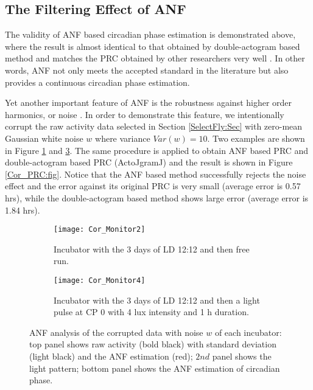 \documentclass[11pt, onecolumn]{IEEEtran}
\begin{document}
\subsection{The Filtering Effect of ANF}\label{PRCnoise:section}
The validity of ANF based circadian phase estimation is demonstrated above, where the result is almost identical to that obtained by double-actogram based method and matches the PRC obtained by other researchers very well \cite{Klarsfeld03}. In other words, ANF not only meets the accepted standard in the literature but also provides a continuous circadian phase estimation.

Yet another important feature of ANF is the robustness against higher order harmonics, or noise \cite{ZhangACC13}. In order to demonstrate this feature, we intentionally corrupt the raw activity data selected in Section \ref{SelectFly:Sec} with zero-mean Gaussian white noise $w$ where variance $Var(w) = 10$. Two examples are shown in Figure \ref{Cor_Monitor2:fig} and \ref{Cor_Monitor4:fig}. The same procedure is applied to obtain ANF based PRC and double-actogram based PRC (ActoJgramJ) and the result is shown in Figure \ref{Cor_PRC:fig}. Notice that the ANF based method successfully rejects the noise effect and the error against its original PRC is very small (average error is 0.57 hrs), while the double-actogram based method shows large error (average error is 1.84 hrs).


\begin{figure}
        \centering
        \begin{subfigure}[t]{0.45\textwidth}
                \texttt{[image: Cor\_Monitor2]}
                \caption{Incubator with the 3 days of LD 12:12 and then free run. \label{Cor_Monitor2:fig}}
        \end{subfigure}
        \qquad
        \begin{subfigure}[t]{0.45\textwidth}
                \texttt{[image: Cor\_Monitor4]}
                \caption{Incubator with the 3 days of LD 12:12 and then a light pulse at CP 0 with 4 lux intensity and 1 h duration.\label{Cor_Monitor4:fig}}
        \end{subfigure}
        \caption{ANF analysis of the corrupted data with noise $w$ of each incubator: top panel shows raw activity (bold black) with standard deviation (light black) and the ANF estimation (red); $2{nd}$ panel shows the light pattern; bottom panel shows the ANF estimation of circadian phase.}
\end{figure}
\end{document}
